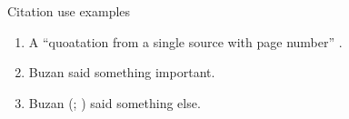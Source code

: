 
Citation use examples

\begin{enumerate}
    \item A ``quoatation from a single source with page number'' \Parencite[][p. 300]{buzan1998}.
    \item Buzan \parencite*[][]{buzan1998} said something important.
    \item Buzan (\cite*{buzan1998}; \Cite{buzan1998}) said something else.
\end{enumerate}

\lipsum[5]



